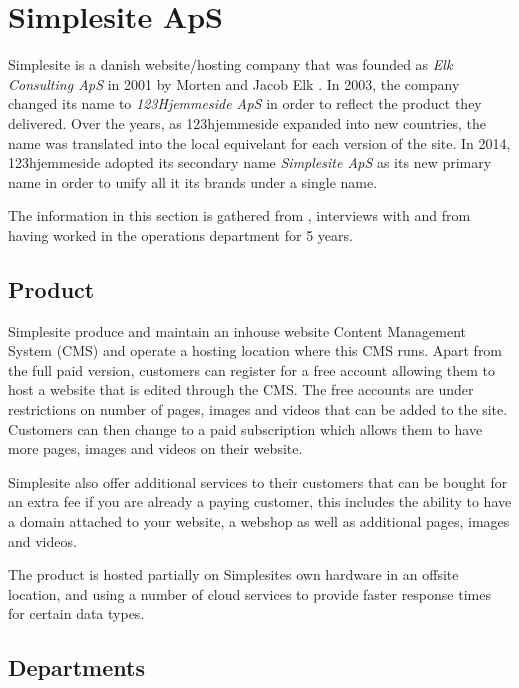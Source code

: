 \section{Simplesite ApS}

Simplesite is a danish website/hosting company that was founded as \textit{Elk
Consulting ApS} in 2001 by Morten and Jacob Elk \cite{cvr2016simplesite}. In
2003, the company changed its name to \textit{123Hjemmeside ApS} in order to
reflect the product they delivered. Over the years, as 123hjemmeside expanded
into new countries, the name was translated into the local equivelant for each
version of the site. In 2014, 123hjemmeside adopted its secondary name
\textit{Simplesite ApS} as its new primary name in order to unify all it its
brands under a single name.

The information in this section is gathered from \cite{cvr2016simplesite},
interviews with and from having worked in the operations department for 5 years.

\subsection{Product}

Simplesite produce and maintain an inhouse website Content Management System
(CMS) and operate a hosting location where this CMS runs. Apart from the full
paid version, customers can register for a free account allowing them to host a
website that is edited through the CMS. The free accounts are under restrictions
on number of pages, images and videos that can be added to the site. Customers
can then change to a paid subscription which allows them to have more pages,
images and videos on their website.

Simplesite also offer additional services to their customers that can be bought
for an extra fee if you are already a paying customer, this includes the ability
to have a domain attached to your website, a webshop as well as additional
pages, images and videos.

The product is hosted partially on Simplesites own hardware in an offsite
location, and using a number of cloud services to provide faster response times
for certain data types.


\subsection{Departments}


